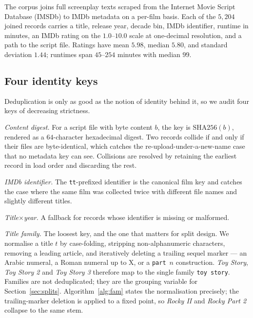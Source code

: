 \documentclass[conference,a4paper]{IEEEtran}
\begin{document}
The corpus joins full screenplay texts scraped from the Internet Movie
Script Database (IMSDb) to IMDb metadata on a per-film basis. Each of the
$5{,}204$ joined records carries a title, release year, decade bin, IMDb
identifier, runtime in minutes, an IMDb rating on the $1.0$--$10.0$ scale
at one-decimal resolution, and a path to the script file. Ratings have
mean $5.98$, median $5.80$, and standard deviation $1.44$; runtimes span
$45$--$254$ minutes with median $99$.

\subsection{Four identity keys}

Deduplication is only as good as the notion of identity behind it, so we
audit four keys of decreasing strictness.

\emph{Content digest.} For a script file with byte content $b$, the key
is $\mathrm{SHA256}(b)$, rendered as a $64$-character hexadecimal
digest. Two records collide if and only if their files are
byte-identical, which catches the re-upload-under-a-new-name case that no
metadata key can see. Collisions are resolved by retaining the earliest
record in load order and discarding the rest.

\emph{IMDb identifier.} The \texttt{tt}-prefixed identifier is the
canonical film key and catches the case where the same film was collected
twice with different file names and slightly different titles.

\emph{Title$\times$year.} A fallback for records whose identifier is
missing or malformed.

\emph{Title family.} The loosest key, and the one that matters for split
design. We normalise a title $t$ by case-folding, stripping
non-alphanumeric characters, removing a leading article, and iteratively
deleting a trailing sequel marker --- an Arabic numeral, a Roman numeral
up to $\mathrm{X}$, or a \texttt{part}~$n$ construction. \emph{Toy
Story}, \emph{Toy Story 2} and \emph{Toy Story 3} therefore map to the
single family \texttt{toy story}. Families are not deduplicated; they are
the grouping variable for Section~\ref{sec:splits}. Algorithm~\ref{alg:fam}
states the normalisation precisely; the trailing-marker deletion is
applied to a fixed point, so \emph{Rocky II} and \emph{Rocky Part 2}
collapse to the same stem.
\end{document}
